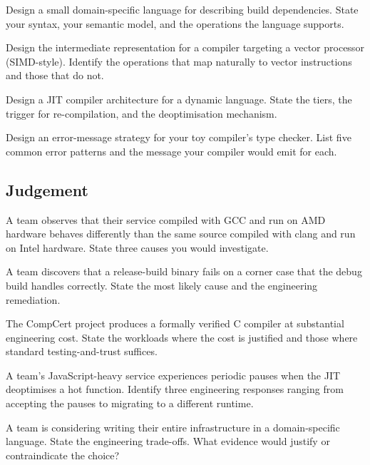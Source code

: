 \begin{exercise}
Design a small domain-specific language for describing build dependencies. State your syntax, your semantic model, and the operations the language supports.
\end{exercise}

\begin{exercise}
Design the intermediate representation for a compiler targeting a vector processor (SIMD-style). Identify the operations that map naturally to vector instructions and those that do not.
\end{exercise}

\begin{exercise}
Design a JIT compiler architecture for a dynamic language. State the tiers, the trigger for re-compilation, and the deoptimisation mechanism.
\end{exercise}

\begin{exercise}
Design an error-message strategy for your toy compiler's type checker. List five common error patterns and the message your compiler would emit for each.
\end{exercise}

\subsection*{Judgement}

\begin{exercise}
A team observes that their service compiled with GCC and run on AMD hardware behaves differently than the same source compiled with clang and run on Intel hardware. State three causes you would investigate.
\end{exercise}

\begin{exercise}
A team discovers that a release-build binary fails on a corner case that the debug build handles correctly. State the most likely cause and the engineering remediation.
\end{exercise}

\begin{exercise}
The CompCert project produces a formally verified C compiler at substantial engineering cost. State the workloads where the cost is justified and those where standard testing-and-trust suffices.
\end{exercise}

\begin{exercise}
A team's JavaScript-heavy service experiences periodic pauses when the JIT deoptimises a hot function. Identify three engineering responses ranging from accepting the pauses to migrating to a different runtime.
\end{exercise}

\begin{exercise}
A team is considering writing their entire infrastructure in a domain-specific language. State the engineering trade-offs. What evidence would justify or contraindicate the choice?
\end{exercise}

